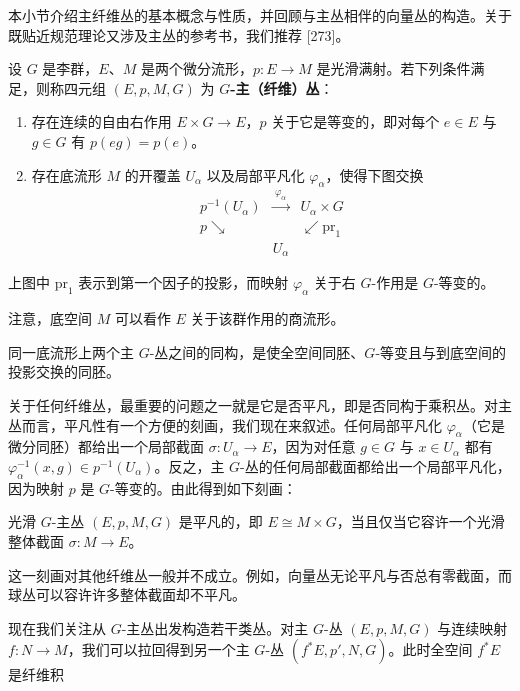 本小节介绍主纤维丛的基本概念与性质，并回顾与主丛相伴的向量丛的构造。关于既贴近规范理论又涉及主丛的参考书，我们推荐 [273]。

\begin{definition}[3.32]
设 $G$ 是李群，$E$、$M$ 是两个微分流形，$p\colon E\to M$ 是光滑满射。若下列条件满足，则称四元组 $(E,p,M,G)$ 为 \textbf{$G$-主（纤维）丛}：
\begin{enumerate}[label=\arabic*.]
\item 存在连续的自由右作用 $E\times G\to E$，$p$ 关于它是等变的，即对每个 $e\in E$ 与 $g\in G$ 有 $p(eg)=p(e)$。
\item 存在底流形 $M$ 的开覆盖 $U_\alpha$ 以及局部平凡化 $\varphi_\alpha$，使得下图交换
\[
\begin{array}{ccc}
p^{-1}(U_\alpha) & \xrightarrow{\ \varphi_\alpha\ } & U_\alpha\times G\\[4pt]
{\scriptstyle p}\searrow & & \swarrow{\scriptstyle \mathrm{pr}_1}\\[2pt]
& U_\alpha &
\end{array}
\]
\end{enumerate}
\end{definition}

上图中 $\mathrm{pr}_1$ 表示到第一个因子的投影，而映射 $\varphi_\alpha$ 关于右 $G$-作用是 $G$-等变的。

注意，底空间 $M$ 可以看作 $E$ 关于该群作用的商流形。

同一底流形上两个主 $G$-丛之间的同构，是使全空间同胚、$G$-等变且与到底空间的投影交换的同胚。

关于任何纤维丛，最重要的问题之一就是它是否平凡，即是否同构于乘积丛。对主丛而言，平凡性有一个方便的刻画，我们现在来叙述。任何局部平凡化 $\varphi_\alpha$（它是微分同胚）都给出一个局部截面 $\sigma\colon U_\alpha\to E$，因为对任意 $g\in G$ 与 $x\in U_\alpha$ 都有 $\varphi_\alpha^{-1}(x,g)\in p^{-1}(U_\alpha)$。反之，主 $G$-丛的任何局部截面都给出一个局部平凡化，因为映射 $p$ 是 $G$-等变的。由此得到如下刻画：

\begin{proposition}[3.33]
光滑 $G$-主丛 $(E,p,M,G)$ 是平凡的，即 $E\cong M\times G$，当且仅当它容许一个光滑整体截面 $\sigma\colon M\to E$。
\end{proposition}

这一刻画对其他纤维丛一般并不成立。例如，向量丛无论平凡与否总有零截面，而球丛可以容许许多整体截面却不平凡。

现在我们关注从 $G$-主丛出发构造若干类丛。对主 $G$-丛 $(E,p,M,G)$ 与连续映射 $f\colon N\to M$，我们可以拉回得到另一个主 $G$-丛 $(f^\ast E,p',N,G)$。此时全空间 $f^\ast E$ 是纤维积

